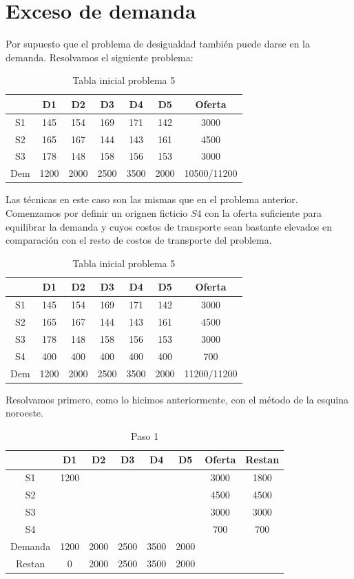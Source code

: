 \documentclass[12pt]{article}  %
\begin{document}
\section{Exceso de demanda}
Por supuesto que el problema de desigualdad también puede darse en la demanda. Resolvamos el siguiente problema:

\begin{table}[H]
\centering
\caption{Tabla inicial problema 5}
\label{tab:Prob5}
\begin{tabular}{c|ccccc|c}
& D1 & D2 & D3 & D4 & D5 & Oferta \\
\hline
S1 & 145 & 154 & 169 & 171 & 142 & 3000 \\
S2 & 165 & 167 & 144 & 143 & 161 & 4500 \\
S3 & 178 & 148 & 158 & 156 & 153 & 3000 \\
\hline
Dem & 1200 & 2000 & 2500 & 3500 & 2000 & \mbox{10500/11200} 
\end{tabular}
\end{table}

Las técnicas en este caso son las mismas que en el problema anterior. Comenzamos por definir un orignen ficticio $S4$ con la oferta suficiente para equilibrar la demanda y cuyos costos de transporte sean bastante elevados en comparación con el resto de costos de transporte del problema.

\begin{table}[H]
\centering
\caption{Tabla inicial problema 5}
\label{tab:ajusteProb5}
\begin{tabular}{c|ccccc|c}
& D1 & D2 & D3 & D4 & D5 & Oferta \\
\hline
S1 & 145 & 154 & 169 & 171 & 142 & 3000 \\
S2 & 165 & 167 & 144 & 143 & 161 & 4500 \\
S3 & 178 & 148 & 158 & 156 & 153 & 3000 \\
S4 & 400 & 400 & 400 & 400 & 400 & 700 \\
\hline
Dem & 1200 & 2000 & 2500 & 3500 & 2000 & \mbox{11200/11200} 
\end{tabular}
\end{table}

Resolvamos primero, como lo hicimos anteriormente, con el método de la esquina noroeste.

\begin{table}[H]
\centering
\caption{Paso 1}
\label{tab:Paso1Prob5}
\begin{tabular}{c|ccccc|cc}
& D1 & D2 & D3 & D4 & D5 & Oferta & Restan\\
\hline
S1 & \cellcolor{yellow}1200 &  &  &  &  & 3000 & 1800 \\
S2 &  &  &  &  &  & 4500 & 4500 \\
S3 &  &  &  &  &  & 3000 & 3000 \\
S4 &  &  &  &  &  & 700 & 700 \\
\hline
Demanda & 1200 & 2000 & 2500 & 3500 & 2000 & & \\
Restan & 0 & 2000 & 2500 & 3500 & 2000 &&
\end{tabular}
\end{table}
\end{document}
